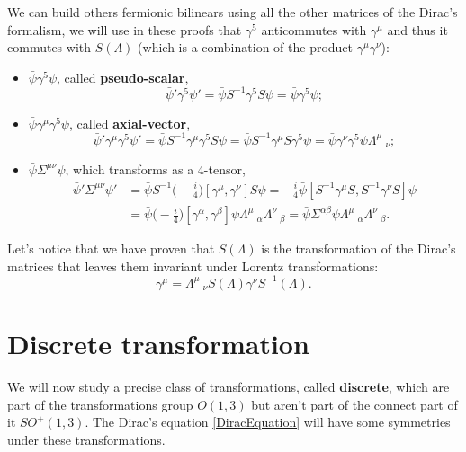 We can build others fermionic bilinears using all the other matrices of the Dirac's formalism, we will use in these proofs that $\gamma^5$ anticommutes with $\gamma^\mu$ and thus it commutes with $S(\Lambda)$ (which is a combination of the product $\gamma^\mu\gamma^\nu$):
\begin{itemize}
    \item $ \bar\psi \gamma^5\psi $, called \textbf{pseudo-scalar},
    \begin{equation*}
        \bar\psi'\gamma^5\psi'=\bar\psi S^{-1}\gamma^5S\psi=\bar\psi \gamma^5\psi;
    \end{equation*}
    \item $\bar\psi \gamma^\mu\gamma^5\psi$, called \textbf{axial-vector},
    \begin{equation*}
        \bar\psi'\gamma^\mu\gamma^5\psi'=\bar\psi S^{-1}\gamma^\mu\gamma^5S\psi=\bar\psi S^{-1}\gamma^\mu S\gamma^5\psi=\bar\psi\gamma^\nu \gamma^5\psi\Lambda^\mu\ _\nu;
    \end{equation*}
    \item $ \bar\psi \Sigma^{\mu\nu}\psi $, which transforms as a 4-tensor,
    \begin{align*}
        \bar\psi'\Sigma^{\mu\nu}\psi'&=\bar\psi S^{-1}\bigg(-\frac{i}{4}\bigg)[\gamma^\mu,\gamma^\nu]S\psi=-\frac{i}{4}\bar\psi[S^{-1} \gamma^\mu S,S^{-1} \gamma^\nu S]\psi\\&=\bar\psi \bigg(-\frac{i}{4}\bigg)[\gamma^\alpha,\gamma^\beta]\psi\Lambda^\mu\ _\alpha\Lambda^\nu\ _\beta=\bar\psi \Sigma^{\alpha\beta}\psi\Lambda^\mu\ _\alpha\Lambda^\nu\ _\beta.
    \end{align*}
\end{itemize}
Let's notice that we have proven that $S(\Lambda)$ is the transformation of the Dirac's matrices that leaves them invariant under Lorentz transformations:
\begin{equation*}
    \gamma^\mu=\Lambda^\mu\ _\nu S(\Lambda)\gamma^\nu S^{-1}(\Lambda).
\end{equation*}
\section{Discrete transformation}
We will now study a precise class of transformations, called \textbf{discrete}, which are part of the transformations group $O(1,3)$ but aren't part of the connect part of it $SO^+(1,3)$. The Dirac's equation \eqref{DiracEquation} will have some symmetries under these transformations.\\


